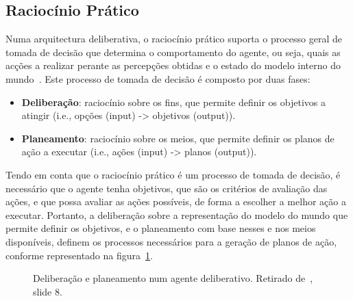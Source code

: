 \subsection{Raciocínio Prático}\label{subsec:raciocinio-pratico}

Numa arquitectura deliberativa, o raciocínio prático suporta o processo
geral de tomada de decisão que determina o comportamento do agente,
ou seja, quais as acções a realizar perante as percepções obtidas e o
estado do modelo interno do mundo~\cite{isel:iasa:slides:arq-agentes-deliberativos}.
Este processo de tomada de decisão é composto por duas fases:

\begin{itemize}
    \item \textbf{Deliberação}: raciocínio sobre os fins, que permite definir os objetivos a atingir (i.e., opções (input) -> objetivos (output)).
    \item \textbf{Planeamento}: raciocínio sobre os meios, que permite definir os planos de ação a executar (i.e., ações (input) -> planos (output)).
\end{itemize}

Tendo em conta que o raciocínio prático é um processo de tomada de decisão, é necessário que o agente tenha objetivos, que são os critérios de avaliação das ações, e que possa avaliar as ações possíveis, de forma a escolher a melhor ação a executar.
Portanto, a deliberação sobre a representação do modelo do mundo que permite definir os objetivos, e o planeamento com base nesses e nos meios disponíveis, definem os processos necessários para a geração de planos de ação, conforme representado na figura~\ref{fig:delib-planeamento}.

\begin{figure}[H]
    \begin{center}
    \end{center}
    \caption{Deliberação e planeamento num agente deliberativo.
    Retirado de~\cite{isel:iasa:slides:arq-agentes-deliberativos}, slide 8.}
    \label{fig:delib-planeamento}
\end{figure}

